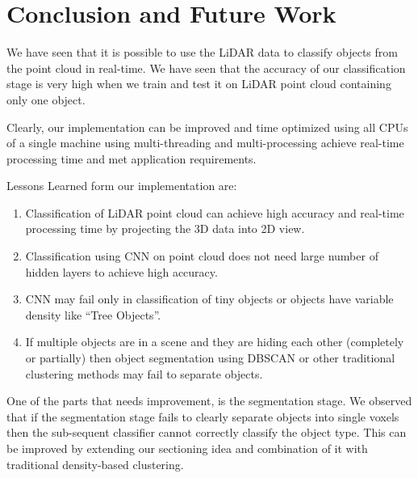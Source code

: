 \section{Conclusion and Future Work}\label{sec:conclusion}
We have seen that it is possible to use the LiDAR data to classify objects from the point cloud in real-time. 
We have seen that the accuracy of our classification stage is very high when we train and test it on LiDAR point cloud containing only one object.  

Clearly, our implementation can be improved and time optimized using all CPUs of a single machine using multi-threading and multi-processing achieve real-time processing time and met application requirements.    


Lessons Learned form our implementation are: 

\begin{enumerate}
  \item Classification of LiDAR point cloud can achieve high accuracy and real-time processing time by projecting the 3D data into 2D view. 
  \item Classification using CNN on point cloud does not need large number of hidden layers to achieve high accuracy.
  \item CNN may fail only in classification of tiny objects or objects have variable density like ``Tree Objects''.   
  \item If multiple objects are in a scene and they are hiding each other (completely or partially) then object segmentation using DBSCAN or other traditional clustering methods may fail to separate objects.   
\end{enumerate}

One of the parts that needs improvement, is the segmentation stage. We observed that if the segmentation stage fails to clearly separate objects into single voxels then the sub-sequent classifier cannot correctly classify the object type. This can be improved by extending our sectioning idea and combination of it with traditional density-based clustering. 

 
  